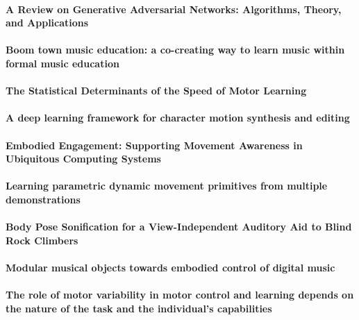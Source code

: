 \documentclass[11pt]{article}
\begin{document}
\paragraph{A Review on Generative Adversarial Networks: Algorithms, Theory, and Applications} \citep{gui_review_2020}


\paragraph{Boom town music education: a co-creating way to learn music within formal music education} \citep{gullberg_boom_2006}


\paragraph{The Statistical Determinants of the Speed of Motor Learning} \citep{he_statistical_2016}


\paragraph{A deep learning framework for character motion synthesis and editing} \citep{holden_deep_2016}


\paragraph{Embodied Engagement: Supporting Movement Awareness in Ubiquitous Computing Systems}


\paragraph{Learning parametric dynamic movement primitives from multiple demonstrations} \citep{matsubara_learning_2011}


\paragraph{Body Pose Sonification for a View-Independent Auditory Aid to Blind Rock Climbers} \citep{ramsay_body_2020}


\paragraph{Modular musical objects towards embodied control of digital music} \citep{rasamimanana_modular_2011}


\paragraph{The role of motor variability in motor control and learning depends on the nature of the task and the individual’s capabilities} \citep{sanchez_role_2017}
\end{document}
